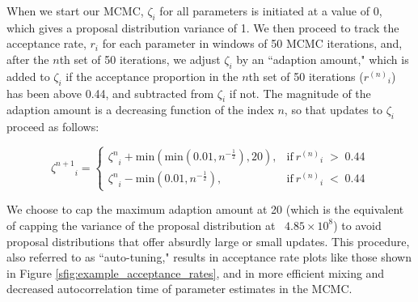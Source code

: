 \documentclass[12pt]{article}
\newcommand{\identifyadmixsource}[1]{{#1^{*}}}
\begin{document}
When we start our MCMC, $\zeta_i$ for all parameters is initiated at a value of 0, which gives a proposal distribution variance of 1.  We then proceed to track the acceptance rate, $r_i$ for each parameter in windows of 50 MCMC iterations, and, after the $n$th set of 50 iterations, we adjust $\zeta_i$ by an ``adaption amount," which is added to $\zeta_i$ if the acceptance proportion in the $n$th set of 50 iterations (${r^{(n)}}_i$) has been above 0.44, and subtracted from $\zeta_i$ if not.  The magnitude of the adaption amount is a decreasing function of the index $n$, so that updates to $\zeta_i$ proceed as follows:

\begin{equation}
{\zeta^{n+1}}_i =
\begin{cases}
{\zeta^{n}}_i + \text{min}(\text{min}(0.01,n^{-\frac{1}{2}}),20), & \text{if} \: {r^{(n)}}_i \; > \; 0.44 \\
{\zeta^{n}}_i - \text{min}(0.01,n^{-\frac{1}{2}}), & \text{if} \: {r^{(n)}}_i \; < \; 0.44
\end{cases}
\label{eq:adpative_mcmc}
\end{equation}

We choose to cap the maximum adaption amount at 20 (which is the equivalent of capping the variance of the proposal distribution at ~$4.85 \times 10^8$) to avoid proposal distributions that offer absurdly large or small updates.  This procedure, also referred to as ``auto-tuning," results in acceptance rate plots like those shown in Figure \ref{sfig:example_acceptance_rates}, and in more efficient mixing and decreased autocorrelation time of parameter estimates in the MCMC.

\end{document}
